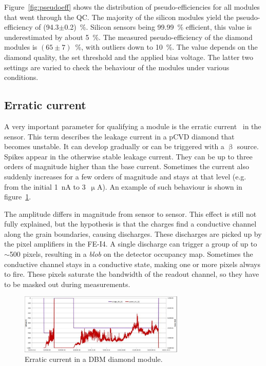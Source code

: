 Figure~\ref{fig:pseudoeff} shows the distribution of pseudo-efficiencies for all modules that went through the QC. The majority of the silicon modules yield the pseudo-efficiency of (94.3$\pm$0.2)~\%. Silicon sensors being 99.99~\% efficient, this value is underestimated by about 5~\%. The measured pseudo-efficiency of the diamond modules is $(65\pm7)$~\%, with outliers down to 10~\%. The value depends on the diamond quality, the set threshold and the applied bias voltage. The latter two settings are varied to check the behaviour of the modules under various conditions. 

\subsection{Erratic current}
A very important parameter for qualifying a module is the erratic current~\cite{Mueller:1175553} in the sensor. This term describes the leakage current in a pCVD diamond that becomes unstable. It can develop gradually or can be triggered with a $\upbeta$ source. Spikes appear in the otherwise stable leakage current. They can be up to three orders of magnitude higher than the base current. Sometimes the current also suddenly increases for a few orders of magnitude and stays at that level (e.g. from the initial 1~nA to 3~$\upmu$A). An example of such behaviour is shown in figure~\ref{fig:erratic1}. 

The amplitude differs in magnitude from sensor to sensor. This effect is still not fully explained, but the hypothesis is that the charges find a conductive channel along the grain boundaries, causing discharges. These discharges are picked up by the pixel amplifiers in the FE-I4. A single discharge can trigger a group of up to $\sim$500 pixels, resulting in a \emph{blob} on the detector occupancy map. Sometimes the conductive channel stays in a conductive state, making one or more pixels always to fire. These pixels saturate the bandwidth of the readout channel, so they have to be masked out during measurements. 

\begin{figure}[!t]
\centering
\includegraphics[width=0.7\textwidth]{04_charge_monitoring/pics/erratic1} 
\caption{Erratic current in a DBM diamond module.}
\label{fig:erratic1}
\end{figure}

